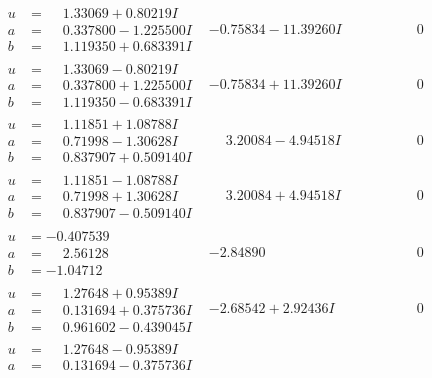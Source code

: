\documentclass[1p]{elsarticle_modified}
\theoremstyle{definition}
\begin{document}
$$\begin{array}{c|c|c}
\begin{aligned}
u &= \phantom{-}1.33069 + 0.80219 I \\
a &= \phantom{-}0.337800 - 1.225500 I \\
b &= \phantom{-}1.119350 + 0.683391 I\end{aligned}
 & -0.75834 - 11.39260 I & \phantom{-0.000000 } 0 \\ \hline\begin{aligned}
u &= \phantom{-}1.33069 - 0.80219 I \\
a &= \phantom{-}0.337800 + 1.225500 I \\
b &= \phantom{-}1.119350 - 0.683391 I\end{aligned}
 & -0.75834 + 11.39260 I & \phantom{-0.000000 } 0 \\ \hline\begin{aligned}
u &= \phantom{-}1.11851 + 1.08788 I \\
a &= \phantom{-}0.71998 - 1.30628 I \\
b &= \phantom{-}0.837907 + 0.509140 I\end{aligned}
 & \phantom{-}3.20084 - 4.94518 I & \phantom{-0.000000 } 0 \\ \hline\begin{aligned}
u &= \phantom{-}1.11851 - 1.08788 I \\
a &= \phantom{-}0.71998 + 1.30628 I \\
b &= \phantom{-}0.837907 - 0.509140 I\end{aligned}
 & \phantom{-}3.20084 + 4.94518 I & \phantom{-0.000000 } 0 \\ \hline\begin{aligned}
u &= -0.407539\phantom{ +0.000000I} \\
a &= \phantom{-}2.56128\phantom{ +0.000000I} \\
b &= -1.04712\phantom{ +0.000000I}\end{aligned}
 & -2.84890\phantom{ +0.000000I} & \phantom{-0.000000 } 0 \\ \hline\begin{aligned}
u &= \phantom{-}1.27648 + 0.95389 I \\
a &= \phantom{-}0.131694 + 0.375736 I \\
b &= \phantom{-}0.961602 - 0.439045 I\end{aligned}
 & -2.68542 + 2.92436 I & \phantom{-0.000000 } 0 \\ \hline\begin{aligned}
u &= \phantom{-}1.27648 - 0.95389 I \\
a &= \phantom{-}0.131694 - 0.375736 I \\

\end{aligned}
\end{array}$$
\end{document}
